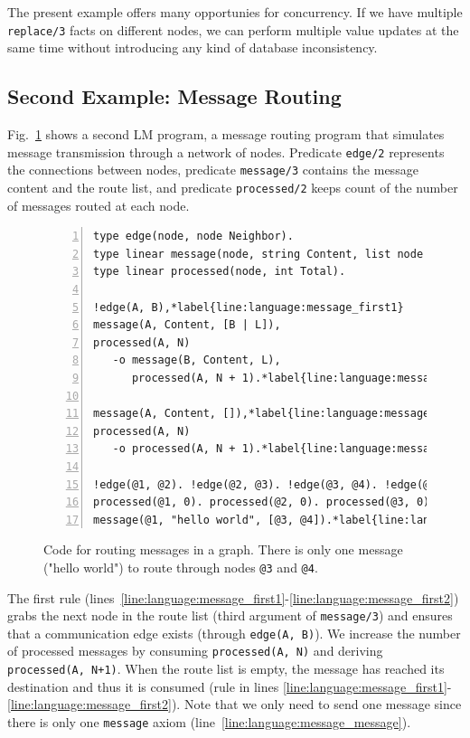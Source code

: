 The present example offers many opportunies for concurrency. If we have multiple
\texttt{replace/3} facts on different nodes, we can perform multiple value
updates at the same time without introducing any kind of database inconsistency.

\subsection{Second Example: Message Routing}

Fig.~\ref{code:message} shows a second LM program, a message routing program
that simulates message transmission through a network of nodes.  Predicate
\texttt{edge/2} represents the connections between nodes, predicate
\texttt{message/3} contains the message content and the route list, and
predicate \texttt{processed/2} keeps count of the number of messages routed at
each node.

\begin{figure}[h!]
\begin{Verbatim}[numbers=left,commandchars=\*\{\},fontsize=\codesize]
type edge(node, node Neighbor).
type linear message(node, string Content, list node Routing).
type linear processed(node, int Total).

!edge(A, B),*label{line:language:message_first1}
message(A, Content, [B | L]),
processed(A, N)
   -o message(B, Content, L),
      processed(A, N + 1).*label{line:language:message_first2}

message(A, Content, []),*label{line:language:message_second1}
processed(A, N)
   -o processed(A, N + 1).*label{line:language:message_second2}

!edge(@1, @2). !edge(@2, @3). !edge(@3, @4). !edge(@1, @3).
processed(@1, 0). processed(@2, 0). processed(@3, 0). processed(@4, 0).
message(@1, "hello world", [@3, @4]).*label{line:language:message_message}
\end{Verbatim}
\caption{Code for routing messages in a graph. There is only one message ("hello
world") to route through nodes \texttt{@3} and \texttt{@4}.}
\label{code:message}
\end{figure}

The first rule
(lines~\ref{line:language:message_first1}-\ref{line:language:message_first2})
grabs the next node in the route list (third argument of \texttt{message/3}) and
ensures that a communication edge exists (through \texttt{edge(A,~B)}). We
increase the number of processed messages by consuming \texttt{processed(A,~N)}
and deriving \texttt{processed(A,~N+1)}.  When the route list is empty, the
message has reached its destination and thus it is consumed (rule in lines
\ref{line:language:message_first1}-\ref{line:language:message_first2}).  Note
that we only need to send one message since there is only one \texttt{message}
axiom (line~\ref{line:language:message_message}).

